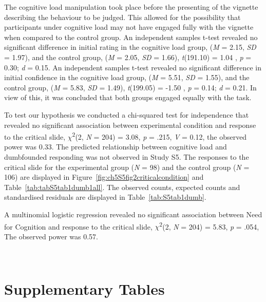 \documentclass[
  man,floatsintext]{apa6}
\begin{document}
The cognitive load manipulation took place before the presenting of the vignette describing the behaviour to be judged. This allowed for the possibility that participants under cognitive load may not have engaged fully with the vignette when compared to the control group. An independent samples t-test revealed no significant difference in initial rating in the cognitive load group, (\emph{M} = 2.15, \emph{SD} = 1.97), and the control group, (\emph{M} = 2.05, \emph{SD} = 1.66), \emph{t}(191.10) = 1.04 , \emph{p} = 0.30; \emph{d} = 0.15. An independent samples t-test revealed no significant difference in initial confidence in the cognitive load group, (\emph{M} = 5.51, \emph{SD} = 1.55), and the control group, (\emph{M} = 5.83, \emph{SD} = 1.49), \emph{t}(199.05) = -1.50 , \emph{p} = 0.14; \emph{d} = 0.21. In view of this, it was concluded that both groups engaged equally with the task.

To test our hypothesis we conducted a chi-squared test for independence that revealed no significant association between experimental condition and response to the critical slide, \(\chi\)\textsuperscript{2}(2, \emph{N} = 204) = 3.08, \emph{p} = .215, \emph{V} = 0.12, the observed power was 0.33. The predicted relationship between cognitive load and dumbfounded responding was not observed in Study S5. The responses to the critical slide for the experimental group (\emph{N} = 98) and the control group (\emph{N} = 106) are displayed in Figure~\ref{fig:ch5S5fig2criticalcondition} and Table~\ref{tab:tabS5tab1dumb1all}. The observed counts, expected counts and standardised residuals are displayed in Table~\ref{tab:S5tab1dumb}.

A multinomial logistic regression revealed no significant association between Need for Cognition and response to the critical slide, \(\chi\)\textsuperscript{2}(2, \emph{N} = 204) = 5.83, \emph{p} = .054, The observed
power was 0.57.

\newpage

~

\hypertarget{supplementary-tables}{%
\section{Supplementary Tables}\label{supplementary-tables}}

\newpage

~
\end{document}
